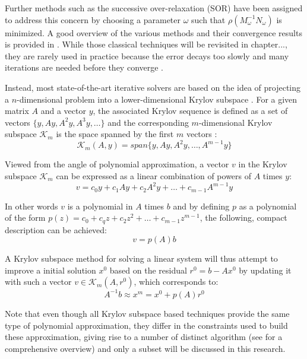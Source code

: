 \noindent Further methods such as the successive over-relaxation (SOR) have been assigned to address this concern by choosing a parameter $\omega$ such that $\rho(M_\omega^{-1}N_\omega)$ is minimized. A good overview of the various methods and their convergence results is provided in \cite{saad_iterative_2003}. 
While those classical techniques will be revisited in chapter..., they are rarely used in practice because the error decays too slowly and many iterations are needed before they converge \cite{strang_introduction_2009}.

Instead, most state-of-the-art iterative solvers are based on the idea of projecting a $n$-dimensional problem into a lower-dimensional Krylov subspace \cite{golub_matrix_2013}. For a given matrix $A$ and a vector $y$, the associated Krylov sequence is defined as a set of vectors $\{y, Ay, A^2y, A^3y, \dots\}$ and the corresponding $m$-dimensional Krylov subspace $\mathcal{K}_m$ is the space spanned by the first $m$ vectors \cite{trefethen_numerical_1997}:
\begin{equation}
    \mathcal{K}_m(A,y) = span\{y, Ay, A^2y, \dots, A^{m-1}y\}
\end{equation}

\noindent Viewed from the angle of polynomial approximation, a vector $v$ in the Krylov subspace $\mathcal{K}_m$ can be expressed as a linear combination of powers of $A$ times $y$:
\begin{equation}
    v = c_0y+c_1Ay+c_2A^2y+\dots+c_{m-1}A^{m-1}y
\end{equation}

\noindent In other words $v$ is a polynomial in $A$ times $b$ and by defining $p$ as a polynomial of the form $p(z) = c_0+c_qz+c_2z^2+\dots+c_{m-1}z^{m-1}$, the following, compact description can be achieved:
\begin{equation}
v=p(A)b    
\end{equation}

\noindent A Krylov subspace method for solving a linear system will thus attempt to improve a initial solution $x^0$ based on the residual $r^0 = b-Ax^0$ by updating it with such a vector $v \in \mathcal{K}_m(A, r^0)$, which corresponds to:
\begin{equation}
    A^{-1}b \approx x^m = x^0+p(A)r^0
\end{equation}

\noindent Note that even though all Krylov subspace based techniques provide the same type of polynomial approximation, they differ in the constraints used to build these approximation, giving rise to a number of distinct algorithm (see \cite{saad_iterative_2003} for a comprehensive overview) and only a subset will be discussed in this research.



